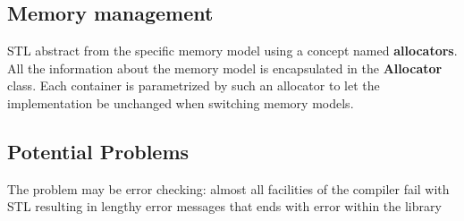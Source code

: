 \subsection{Memory management}
STL abstract from the specific memory model using a concept named \textbf{allocators}.
All the information about the memory model is
encapsulated in the \textbf{Allocator} class.
Each container is parametrized by such an allocator to let
the implementation be unchanged when switching
memory models.

\subsection{Potential Problems}
The problem may be error checking: 
almost all facilities of the compiler fail with STL resulting in lengthy error messages that ends with error within the library